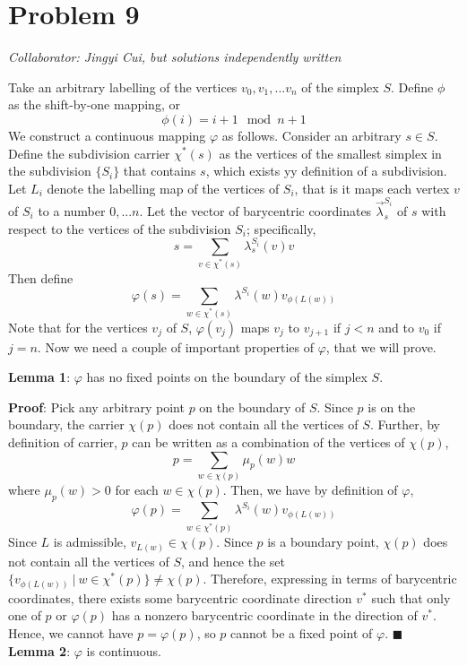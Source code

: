 \documentclass[10pt,letter]{article}
\begin{document}
\section*{Problem 9}
\textit{Collaborator: Jingyi Cui, but solutions independently written}

Take an arbitrary labelling of the vertices $v_0, v_1, ... v_n$ of the simplex $S$. Define $\phi$ as the shift-by-one mapping, or \[ \phi(i) = i + 1 \mod {n+1} \]
We construct a continuous mapping $\varphi$ as follows. Consider an arbitrary $s \in S$. Define the subdivision carrier $\chi^*(s)$ as the vertices of the smallest simplex in the subdivision $\{ S_i \}$ that contains $s$, which exists yy definition of a subdivision. Let $L_i$ denote the labelling map of the vertices of $S_i$, that is it maps each vertex $v$ of $S_i$ to a number $0, ... n$. Let the vector of barycentric coordinates $\vec{\lambda}^{S_i}_s$ of $s$ with respect to the vertices of the subdivision $S_i$; specifically,
\[ s = \sum_{v \in \chi^*(s) } \lambda^{S_i}_s(v) v  \]
Then define
\[ \varphi(s) = \sum_{w \in \chi^*(s) } \lambda^{S_i}(w) v_{\phi(L(w))} \]
Note that for the vertices $v_j$ of $S$, $\varphi(v_j)$ maps $v_j$ to $v_{j+1}$ if $j < n$ and to $v_0$ if $j=n$. Now we need a couple of important properties of $\varphi$, that we will prove.

\textbf{Lemma 1}: $\varphi$ has no fixed points on the boundary of the simplex $S$.

\textbf{Proof}:  Pick any arbitrary point $p$ on the boundary of $S$. Since $p$ is on the boundary, the carrier $\chi(p)$ does not contain all the vertices of $S$. Further, by definition of carrier, $p$ can be written as a combination of the vertices of $\chi(p)$,
\[ p = \sum_{w \in \chi(p)} \mu_p(w)w  \]
where $\mu_p(w) > 0$ for each $w \in \chi(p)$. Then, we have by definition of $\varphi$,
\[ \varphi(p) = \sum_{w \in \chi^*(p) } \lambda^{S_i}(w) v_{\phi(L(w))} \]
Since $L$ is admissible, $v_{L(w)} \in \chi(p)$. Since $p$ is a boundary point, $\chi(p)$ does not contain all the vertices of $S$, and hence the set $\{ v_{\phi(L(w))} \ | \ w \in \chi^*(p)\} \neq \chi(p) $. Therefore, expressing in terms of barycentric coordinates, there exists some barycentric coordinate direction $v^*$ such that only one of $p$ or $\varphi(p)$ has a nonzero barycentric coordinate in the direction of $v^*$. Hence, we cannot have $p = \varphi(p)$, so $p$ cannot be a fixed point of $\varphi$. $\blacksquare$ \\

\textbf{Lemma 2}: $\varphi$ is continuous.
\end{document}
